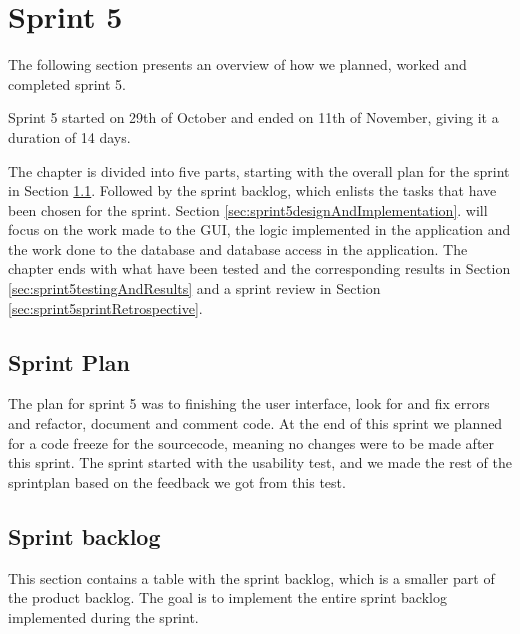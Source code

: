 \chapter{Sprint 5}
\label{chap:sprint5}

The following section presents an overview of how we planned, worked and
completed sprint 5.

Sprint 5 started on 29th of October and ended on 11th of November, giving it a duration of 14 
days.

The chapter is divided into five parts, starting with the overall plan for the
sprint in Section \ref{sec:sprint5sprintplan}. Followed by the sprint backlog, which
enlists the tasks that have been chosen for the sprint. Section
\ref{sec:sprint5designAndImplementation}.
will focus on the work made to the GUI, the logic implemented in the application and the work done to the database and database access in the application.
The chapter ends with what have been tested and the corresponding results in
Section \ref{sec:sprint5testingAndResults} and a sprint review in Section
\ref{sec:sprint5sprintRetrospective}.

\section{Sprint Plan}
\label{sec:sprint5sprintplan}
The plan for sprint 5 was to finishing the user interface, look for and fix errors and refactor, document and comment code. At the end of this sprint we planned for a code freeze for the sourcecode, meaning no changes were to be made after this sprint. The sprint started with the usability test, and we made the rest of the sprintplan based on the feedback we got from this test.

\section{Sprint backlog}
This section contains a table with the sprint backlog, which is a smaller part of the product backlog. The goal is to implement the entire sprint backlog implemented during the sprint.

